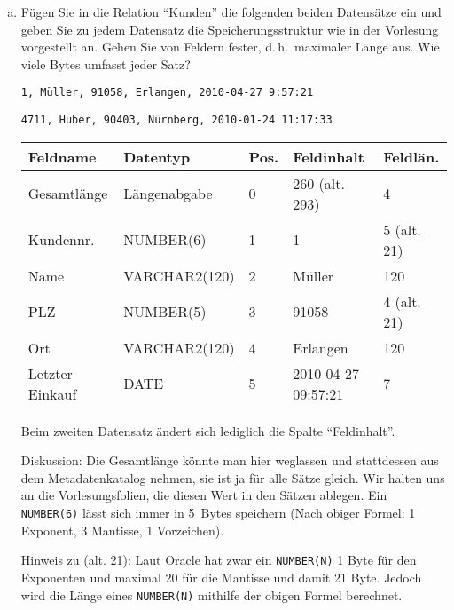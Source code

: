 \begin{enumerate}[a)]
	\item \label{Speicherungsstrukturen_1} Fügen Sie in die Relation "`Kunden"' die folgenden beiden Datensätze ein und geben Sie zu jedem Datensatz die Speicherungsstruktur wie in der Vorlesung vorgestellt an. Gehen Sie von Feldern fester, d.\,h.\ maximaler Länge aus. Wie viele Bytes umfasst jeder Satz?

	\texttt{1, Müller, 91058, Erlangen, 2010-04-27 9:57:21}

	\texttt{4711, Huber, 90403, Nürnberg, 2010-01-24 11:17:33}

	\begin{solution}
	\begin{tabular}{lllll}
		\hline\hline
		\textbf{Feldname} & \textbf{Datentyp} & \textbf{Pos.} & \textbf{Feldinhalt}                & \textbf{Feldlän.} \\ \hline\hline
		Gesamtlänge       & Längenabgabe      & 0             & 260 (alt. 293)                     & 4                 \\ \hline
		Kundennr.         & NUMBER(6)         & 1             & 1                                  & 5  (alt. 21)      \\ \hline
		Name              & VARCHAR2(120)     & 2             & Müller                             & 120               \\ \hline
		PLZ               & NUMBER(5)         & 3             & 91058                              & 4 (alt. 21)       \\ \hline
		Ort               & VARCHAR2(120)     & 4             & Erlangen                           & 120               \\ \hline
		Letzter Einkauf   & DATE              & 5             & \footnotesize{2010-04-27 09:57:21} & 7                 \\ \hline
	\end{tabular}

    Beim zweiten Datensatz ändert sich lediglich die Spalte "`Feldinhalt"'.

	Diskussion:
Die Gesamtlänge könnte man hier weglassen und stattdessen aus dem Metadatenkatalog nehmen, sie ist ja für alle Sätze gleich. Wir halten uns an die Vorlesungsfolien, die diesen Wert in den Sätzen ablegen.
Ein \texttt{NUMBER(6)} lässt sich immer in 5~Bytes speichern (Nach obiger Formel: 1 Exponent, 3 Mantisse, 1 Vorzeichen).

\underline{Hinweis zu (alt. 21):}
Laut Oracle hat zwar ein \texttt{NUMBER(N)} 1 Byte für den Exponenten und maximal 20 für die Mantisse und damit 21 Byte.
Jedoch wird die Länge eines \texttt{NUMBER(N)} mithilfe der obigen Formel berechnet.



\end{solution}
\end{enumerate}
